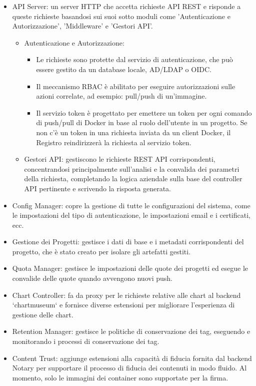 \documentclass[12pt]{report}
\begin{document}
\begin{itemize}
  \item API Server: un server HTTP che accetta richieste API REST e risponde a queste richieste basandosi sui suoi sotto moduli come 'Autenticazione e Autorizzazione', 'Middleware' e 'Gestori API'.
  \begin{itemize}
    \item Autenticazione e Autorizzazione:
    \begin{itemize}
      \item Le richieste sono protette dal servizio di autenticazione, che può essere gestito da un database locale, AD/LDAP o OIDC.
      \item Il meccanismo RBAC è abilitato per eseguire autorizzazioni sulle azioni correlate, ad esempio: pull/push di un'immagine.
      \item Il servizio token è progettato per emettere un token per ogni comando di push/pull di Docker in base al ruolo dell'utente in un progetto. Se non c'è un token in una richiesta inviata da un client Docker, il Registro reindirizzerà la richiesta al servizio token.
    \end{itemize}
    \item Gestori API: gestiscono le richieste REST API corrispondenti, concentrandosi principalmente sull'analisi e la convalida dei parametri della richiesta, completando la logica aziendale sulla base del controller API pertinente e scrivendo la risposta generata.
  \end{itemize}
  \item Config Manager: copre la gestione di tutte le configurazioni del sistema, come le impostazioni del tipo di autenticazione, le impostazioni email e i certificati, ecc.
  \item Gestione dei Progetti: gestisce i dati di base e i metadati corrispondenti del progetto, che è stato creato per isolare gli artefatti gestiti.
  \item Quota Manager: gestisce le impostazioni delle quote dei progetti ed esegue le convalide delle quote quando avvengono nuovi push.
  \item Chart Controller: fa da proxy per le richieste relative alle chart al backend `chartmuseum` e fornisce diverse estensioni per migliorare l'esperienza di gestione delle chart.
  \item Retention Manager: gestisce le politiche di conservazione dei tag, eseguendo e monitorando i processi di conservazione dei tag.
  \item Content Trust: aggiunge estensioni alla capacità di fiducia fornita dal backend Notary per supportare il processo di fiducia dei contenuti in modo fluido. Al momento, solo le immagini dei container sono supportate per la firma.

\end{itemize}
\end{document}

